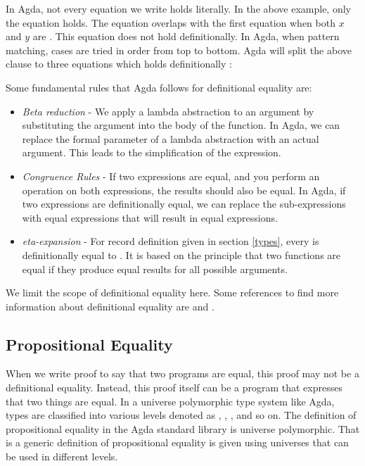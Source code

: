 In Agda, not every equation we write holds literally. In the above example,
only the equation  holds. The equation  overlaps with the first equation when both $x$ and $y$ are
. This equation does not hold definitionally. In Agda, when pattern
matching, cases are tried in order from top to bottom. Agda will split the above
clause to three equations which holds definitionally \cite{abel2012agda}:
\begin{description}
  \item[] 
  \item[] 
  \item[] 
\end{description}

Some fundamental rules that Agda follows for definitional equality are: 
\begin{itemize}
  \item \emph{Beta reduction} - We apply a lambda abstraction to an argument by
  substituting the argument into the body of the function. In Agda, we can
  replace the formal parameter of a lambda abstraction with an actual argument.
  This leads to the simplification of the expression.
  \item \emph{Congruence Rules} - If two expressions are equal, and you perform
  an operation on both expressions, the results should also be equal. In
  Agda, if two expressions are definitionally equal, we can replace the
  sub-expressions with equal expressions that will result in equal expressions.
  \item \emph{eta-expansion} - For record definition  given in
  section \ref{types}, every  is definitionally equal to
  . It is based on
  the principle that two functions are equal if they produce equal results for
  all possible arguments. 
\end{itemize}

We limit the scope of definitional equality here. Some references to find more
information about definitional equality are \cite{norell2007towards} and
\cite{martin1984intuitionistic}. 

\subsection{Propositional Equality}
When we write proof to say that two programs are equal, this proof may not be
a definitional equality. Instead, this proof itself can be a program that
expresses that two things are equal. In a universe polymorphic type system like
Agda, types are classified into various levels denoted as , ,
, and so on. The definition of propositional equality in the Agda standard
library is universe polymorphic. That is a generic definition of propositional
equality is given using universes that can be used in different levels.

